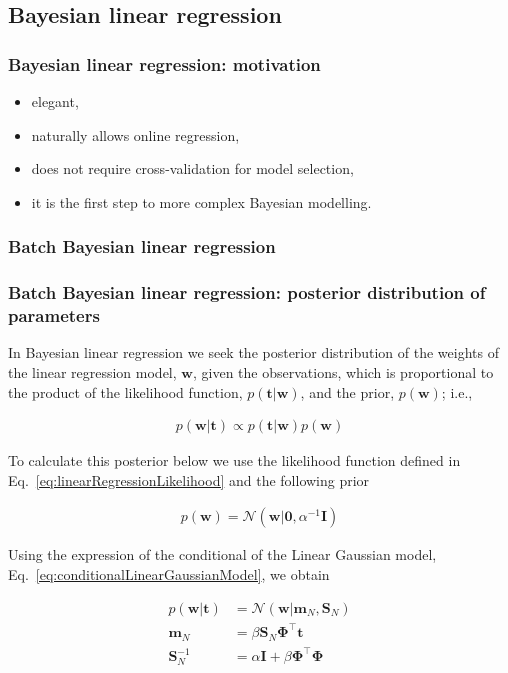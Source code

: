 \documentclass{beamer}
\begin{document}
\subsection{Bayesian linear regression}

\begin{frame}
    \frametitle{Bayesian linear regression: motivation}

	\begin{itemize}
		\item elegant,
		\item naturally allows online regression,
		\item does not require cross-validation for model selection,
		\item it is the first step to more complex Bayesian modelling.
	\end{itemize}

\end{frame}

\subsubsection{Batch Bayesian linear regression}

\begin{frame}
    \frametitle{Batch Bayesian linear regression: posterior distribution of parameters}

	\scriptsize
	In Bayesian linear regression we seek the posterior distribution of the
weights of the linear regression model, $\mathbf{w}$, given the observations, which
is proportional to the product of the likelihood function,
$p(\mathbf{t}|\mathbf{w})$, and the prior, $p(\mathbf{w})$; i.e., 

	\begin{align*}
		p(\mathbf{w}|\mathbf{t})\propto p(\mathbf{t}|\mathbf{w})p(\mathbf{w})
	\end{align*}

	To calculate this posterior below we use the likelihood function defined in
Eq.~\ref{eq:linearRegressionLikelihood} and the following prior

	\begin{align*}
		p(\mathbf{w})=\mathcal{N}(\mathbf{w}|\mathbf{0},\alpha^{-1}\mathbf{I})
	\end{align*}

	Using the expression of the conditional of the Linear Gaussian model,
Eq.~\ref{eq:conditionalLinearGaussianModel}, we obtain

	\begin{align}
		p(\mathbf{w}|\mathbf{t})&=\mathcal{N}(\mathbf{w}|\mathbf{m}_N,\mathbf{S}_N)\nonumber\\
		\mathbf{m}_N&=\beta\mathbf{S}_N\boldsymbol{\Phi}^\intercal\mathbf{t}\label{eq:blrPosteriorMean}\\
		\mathbf{S}_N^{-1}&=\alpha\mathbf{I}+\beta\boldsymbol{\Phi}^\intercal\boldsymbol{\Phi}\label{eq:blrPosteriorCov}
	\end{align}

	\normalsize
\end{frame}
\end{document}
